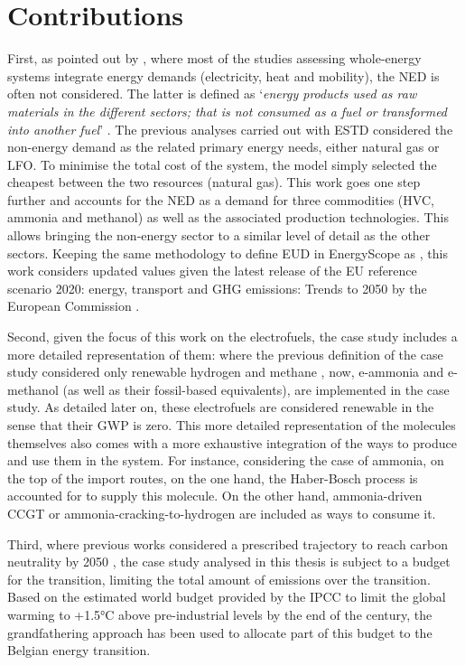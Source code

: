 \section*{Contributions}
\label{sec:cs:contributions}
First, as pointed out by \citet{rixhon2022integration}, where most of the studies assessing whole-energy systems integrate energy demands (\ie electricity, heat and mobility), the \acrfull{NED} is often not considered. The latter is defined as ‘\textit{energy products used as raw materials in the different sectors; that is not consumed as a fuel or transformed into another fuel}’ \cite{Eurostat2019}. The previous analyses carried out with \gls{ESTD} considered the non-energy demand as the related primary energy needs, \ie either natural gas or \gls{LFO}. To minimise the total cost of the system, the model simply selected the cheapest between the two resources (\ie natural gas). This work goes one step further and accounts for the \gls{NED} as a demand for three commodities (\ie \gls{HVC}, ammonia and methanol) as well as the associated production technologies. This allows bringing the non-energy sector to a similar level of detail as the other sectors.  Keeping the same methodology to define \gls{EUD} in EnergyScope as \citet{Limpens2020}, this work considers updated values given the latest release of the \og EU reference scenario 2020: energy, transport and GHG emissions: Trends to 2050 \fg by the European Commission \cite{EuropeanCommission2021}.

Second, given the focus of this work on the electrofuels, the case study includes a more detailed representation of them: where the previous definition of the case study considered only renewable hydrogen and methane \cite{limpens2021generating}, now, e-ammonia and e-methanol (as well as their fossil-based equivalents), are implemented in the case study. As detailed later on, these electrofuels are considered renewable in the sense that their \gls{GWP} is zero. This more detailed representation of the molecules themselves also comes with a more exhaustive integration of the ways to produce and use them in the system. For instance, considering the case of ammonia, on the top of the import routes, on the one hand, the Haber-Bosch process is accounted for to supply this molecule. On the other hand, ammonia-driven \gls{CCGT} or ammonia-cracking-to-hydrogen are included as ways to consume it.

Third, where previous works considered a prescribed  trajectory to reach carbon neutrality by 2050 \cite{limpens2021generating, limpens2024pathway}, the case study analysed in this thesis is subject to a  budget for the transition, \ie limiting the total amount of emissions over the transition. Based on the estimated world budget provided by the \gls{IPCC} to limit the global warming to +1.5°C above pre-industrial levels by the end of the century, the grandfathering approach has been used to allocate part of this budget to the Belgian energy transition.

